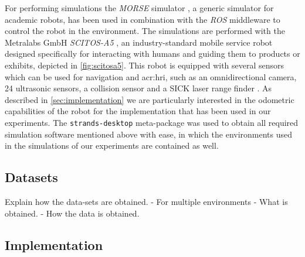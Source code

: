 For performing simulations the \textit{MORSE} simulator \cite{morse_simpar_2012}, a generic simulator for academic robots, has been used in combination with the \textit{ROS} middleware to control the robot in the environment.
The simulations are performed with the Metralabs GmbH \textit{SCITOS-A5} \cite{Metralabs}, an industry-standard mobile service robot designed specifically for interacting with humans and guiding them to products or exhibits, depicted in \autoref{fig:scitosa5}.
This robot is equipped with several sensors which can be used for navigation and \acrfull{acr:hri}, such as an omnidirectional camera, 24 ultrasonic sensors, a collision sensor and a SICK laser range finder \cite{gross2008shopbot}.
As described in \autoref{sec:implementation} we are particularly interested in the odometric capabilities of the robot for the implementation that has been used in our experiments.
The \texttt{strands-desktop} meta-package was used to obtain all required simulation software mentioned above with ease, in which the environments used in the simulations of our experiments are contained as well.

%


\subsection{Datasets}
\label{sec:datasets}

Explain how the data-sets are obtained. 
- For multiple environments - What is obtained. - How the data is obtained.

\subsection{Implementation}
\label{sec:implementation}

